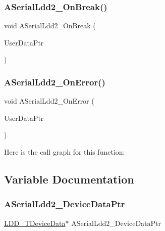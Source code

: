\subsubsection{\texorpdfstring{A\+Serial\+Ldd2\+\_\+\+On\+Break()}{ASerialLdd2\_OnBreak()}}
{\footnotesize\ttfamily void A\+Serial\+Ldd2\+\_\+\+On\+Break (\begin{DoxyParamCaption}\item[{\hyperlink{group___p_e___types__module_ga0b66a73f87238a782318aa0be7578e35}{L\+D\+D\+\_\+\+T\+User\+Data} $\ast$}]{User\+Data\+Ptr }\end{DoxyParamCaption})}

\mbox{\label{group___a_s2__module_ga145a063bdf852caee1c1b8adeb02fc77}} 
\subsubsection{\texorpdfstring{A\+Serial\+Ldd2\+\_\+\+On\+Error()}{ASerialLdd2\_OnError()}}
{\footnotesize\ttfamily void A\+Serial\+Ldd2\+\_\+\+On\+Error (\begin{DoxyParamCaption}\item[{\hyperlink{group___p_e___types__module_ga0b66a73f87238a782318aa0be7578e35}{L\+D\+D\+\_\+\+T\+User\+Data} $\ast$}]{User\+Data\+Ptr }\end{DoxyParamCaption})}

Here is the call graph for this function\+:


\subsection{Variable Documentation}
\mbox{\label{group___a_s2__module_gadee68051b76891befdaf56e3da755391}} 
\subsubsection{\texorpdfstring{A\+Serial\+Ldd2\+\_\+\+Device\+Data\+Ptr}{ASerialLdd2\_DeviceDataPtr}}
{\footnotesize\ttfamily \hyperlink{group___p_e___types__module_gac5cf1362f1f0e3a2ce71b1bf2276d091}{L\+D\+D\+\_\+\+T\+Device\+Data}$\ast$ A\+Serial\+Ldd2\+\_\+\+Device\+Data\+Ptr}


